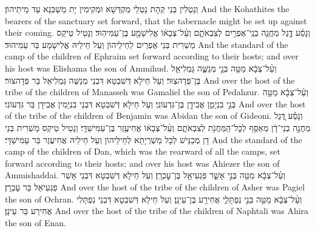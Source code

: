 {וְנָטְלִין בְּנֵי קְהָת נָטְלֵי מַקְדְּשָׁא וּמְקִימִין יָת מַשְׁכְּנָא עַד מֵיתֵיהוֹן׃}
{And the Kohathites the bearers of the sanctuary set forward, that the tabernacle might be set up against their coming.}{}
{וְנָסַ֗ע דֶּ֛גֶל מַחֲנֵ֥ה בְנֵֽי־אֶפְרַ֖יִם לְצִבְאֹתָ֑ם וְעַ֨ל־צְבָא֔וֹ אֱלִישָׁמָ֖ע בֶּן־עַמִּיהֽוּד׃}
{וְנָטֵיל טֵיקַס מַשְׁרִית בְּנֵי אֶפְרַיִם לְחֵילֵיהוֹן וְעַל חֵילֵיהּ אֱלִישָׁמָע בַּר עַמִּיהוּד׃}
{And the standard of the camp of the children of Ephraim set forward according to their hosts; and over his host was Elishama the son of Ammihud.}{}
{וְעַ֨ל־צְבָ֔א מַטֵּ֖ה בְּנֵ֣י מְנַשֶּׁ֑ה גַּמְלִיאֵ֖ל בֶּן־פְּדָהצֽוּר׃}
{וְעַל חֵילָא דְּשִׁבְטָא דִּבְנֵי מְנַשֶּׁה גַּמְלִיאֵל בַּר פְּדָהצוּר׃}
{And over the host of the tribe of the children of Manasseh was Gamaliel the son of Pedahzur.}{}
{וְעַ֨ל־צְבָ֔א מַטֵּ֖ה בְּנֵ֣י בִנְיָמִ֑ן אֲבִידָ֖ן בֶּן־גִּדְעוֹנִֽי׃}
{וְעַל חֵילָא דְּשִׁבְטָא דִּבְנֵי בִנְיָמִין אֲבִידָן בַּר גִּדְעוֹנִי׃}
{And over the host of the tribe of the children of Benjamin was Abidan the son of Gideoni.}{}
{וְנָסַ֗ע דֶּ֚גֶל מַחֲנֵ֣ה בְנֵי־דָ֔ן מְאַסֵּ֥ף לְכׇל־הַֽמַּחֲנֹ֖ת לְצִבְאֹתָ֑ם וְעַ֨ל־צְבָא֔וֹ אֲחִיעֶ֖זֶר בֶּן־עַמִּישַׁדָּֽי׃
}
{וְנָטֵיל טֵיקַס מַשְׁרִית בְּנֵי דָן מְכַנֵּישׁ לְכָל מַשְׁרְיָתָא לְחֵילֵיהוֹן וְעַל חֵילֵיהּ אֲחִיעֶזֶר בַּר עַמִּישַׁדָּי׃}
{And the standard of the camp of the children of Dan, which was the rearward of all the camps, set forward according to their hosts; and over his host was Ahiezer the son of Ammishaddai.}{}
{וְעַ֨ל־צְבָ֔א מַטֵּ֖ה בְּנֵ֣י אָשֵׁ֑ר פַּגְעִיאֵ֖ל בֶּן־עׇכְרָֽן׃}
{וְעַל חֵילָא דְּשִׁבְטָא דִּבְנֵי אָשֵׁר פַּגְעִיאֵל בַּר עָכְרָן׃}
{And over the host of the tribe of the children of Asher was Pagiel the son of Ochran.}{}
{וְעַ֨ל־צְבָ֔א מַטֵּ֖ה בְּנֵ֣י נַפְתָּלִ֑י אֲחִירַ֖ע בֶּן־עֵינָֽן׃}
{וְעַל חֵילָא דְּשִׁבְטָא דִּבְנֵי נַפְתָּלִי אֲחִירַע בַּר עֵינָן׃}
{And over the host of the tribe of the children of Naphtali was Ahira the son of Enan.}{}
